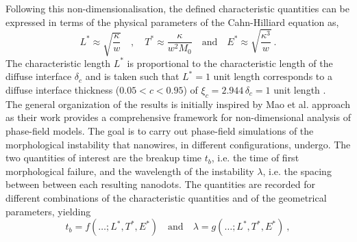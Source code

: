Following this non-dimensionalisation, the defined characteristic quantities can be expressed in terms of the physical parameters of the Cahn-Hilliard equation as,
\begin{equation}\label{eq:3-charac}
    L^* \approx \sqrt{\frac{\kappa}{w}}\quad ,  \quad T^* \approx \frac{\kappa}{w^2 M_0}\quad \text{and} \quad E^* \approx \sqrt{\frac{\kappa^3}{w}}\ .
\end{equation}
The characteristic length $L^*$ is proportional to the characteristic length of the diffuse interface $\delta_c$ and is taken such that $L^* = 1$ unit length corresponds to a diffuse interface thickness ($0.05<c<0.95$) of $\xi_c=2.944\, \delta_c = 1$ unit length \cite{JokisaariVoorheesGuyerWarrenHeinonen2017}.\\
The general organization of the results is initially inspired by Mao et al. \cite{MaoDemkowicz2021} approach as their work provides a comprehensive framework for non-dimensional analysis of phase-field models.
The goal is to carry out phase-field simulations of the morphological instability that nanowires, in different configurations, undergo. The two quantities of interest are the breakup time $t_b$, i.e. the time of first morphological failure, and the wavelength of the instability $\lambda$, i.e. the spacing between between each resulting nanodots. The quantities are recorded for different combinations of the characteristic quantities and of the geometrical parameters, yielding
\begin{equation}
    t_b = f(\dots; L^*, T^*, E^*) \quad\text{and} \quad \lambda = g(\dots; L^*, T^*, E^*)\ ,
\end{equation}
